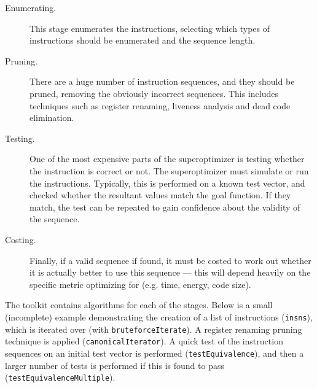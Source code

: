 \documentclass{article}
\begin{document}
\begin{description}
    \item[Enumerating.] This stage enumerates the instructions, selecting which types of instructions should be enumerated and the sequence length.
    \item[Pruning.] There are a huge number of instruction sequences, and they should be pruned, removing the obviously incorrect sequences. This includes techniques such as register renaming, liveness analysis and dead code elimination.
    \item[Testing.] One of the most expensive parts of the superoptimizer is testing whether the instruction is correct or not. The superoptimizer must simulate or run the instructions. Typically, this is performed on a known test vector, and checked whether the resultant values match the goal function. If they match, the test can be repeated to gain confidence about the validity of the sequence.
    \item[Costing.] Finally, if a valid sequence if found, it must be costed to work out whether it is actually better to use this sequence --- this will depend heavily on the specific metric optimizing for (e.g. time, energy, code size).
\end{description}

The toolkit contains algorithms for each of the stages. Below is a small (incomplete) example demonstrating the creation of a list of instructions (\texttt{insns}), which is iterated over (with \texttt{bruteforceIterate}). A register renaming pruning technique is applied (\texttt{canonicalIterator}). A quick test of the instruction sequences on an initial test vector is performed (\texttt{testEquivalence}), and then a larger number of tests is performed if this is found to pass (\texttt{testEquivalenceMultiple}).
\end{document}

